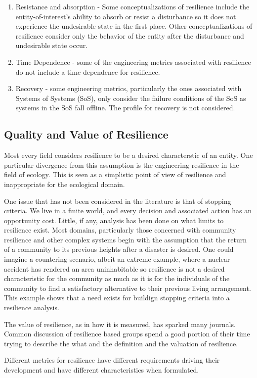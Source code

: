 \begin{enumerate}
\item Resistance and absorption - Some conceptualizations of
  resilience include the entity-of-interest's ability to absorb or
  resist a disturbance so it does not experience the undesirable state
  in the first place. Other conceptualizations of resilience consider
  only the behavior of the entity after the disturbance and
  undesirable state occur.
  
\item Time Dependence - some of the engineering metrics associated
  with resilience do not include a time dependence for resilience. 
  
\item Recovery - some engineering metrics, particularly the ones
  associated with Systems of Systems (SoS), only consider the failure
  conditions of the SoS as systems in the SoS fall offline. The
  profile for recovery is not considered.
  
  
\end{enumerate}

\subsection{Quality and Value of Resilience}

Most every field considers resilience to be a desired characterstic of
an entity. One particular divergence from this assumption is the
engineering resilience in the field of ecology. This is seen as a
simplistic point of view of resilience and inappropriate for the
ecological domain.

One issue that has not been considered in the literature is that of
stopping criteria. We live in a finite world, and every decision and
associated action has an opportunity cost. Little, if any, analysis
has been done on what limits to resilience exist. Most domains,
particularly those concerned with community resilience and other
complex systems begin with the assumption that the return of a
community to its previous heights after a disaster is desired. One
could imagine a countering scenario, albeit an extreme example, where
a nuclear accident has rendered an area uninhabitable so resilience is
not a desired characteristic for the community as much as it is for
the individuals of the community to find a satisfactory alternative to
their previous living arrangement.  This example shows that a need
exists for buildign stopping criteria into a resilience analysis.

The value of resilience, as in how it is measured, has sparked many
journals. Common discussion of resilience based groups spend a good
portion of their time trying to describe the what and the definition
and the valuation of resilience.

Different metrics for resilience have different requirements driving
their development and have different characteristics when formulated. 


\cite{Barker2013}
